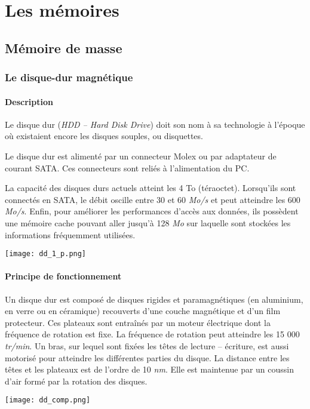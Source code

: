 \section{Les mémoires}
\subsection{Mémoire de masse}
\subsubsection{Le disque-dur magnétique}


\paragraph*{Description}
\begin{minipage}[c]{.65\linewidth}
Le disque dur (\textit{HDD -- Hard Disk Drive}) doit son nom à sa technologie à l'époque où existaient encore les disques souples, ou disquettes.

Le disque dur est alimenté par un connecteur Molex ou par adaptateur de courant SATA. Ces connecteurs sont reliés à l'alimentation du PC. 

La capacité des disques durs actuels atteint les 4 To (téraoctet). Lorsqu'ils sont connectés en SATA, le débit oscille entre 30 et 60 \textit{Mo/s} et peut atteindre les 600 \textit{Mo/s}. Enfin, pour améliorer les performances d'accès aux données, ils possèdent une mémoire cache pouvant aller jusqu'à 128 \textit{Mo} sur laquelle sont stockées les informations fréquemment utilisées. 

\end{minipage}\hfill
\begin{minipage}[c]{.3\linewidth}
\begin{center}
\texttt{[image: dd\_1\_p.png]}
\end{center}
\end{minipage}


\paragraph*{Principe de fonctionnement}


\begin{minipage}[c]{.6\linewidth}
Un disque dur est composé de disques rigides et paramagnétiques (en aluminium, en verre ou en céramique) recouverts d'une couche magnétique et d'un film protecteur. Ces plateaux sont entraînés par un moteur électrique dont la fréquence de rotation est fixe. La fréquence de rotation peut atteindre les 15 000 \textit{tr/min}. Un bras, sur lequel sont fixées les têtes de lecture -- écriture, est aussi motorisé pour atteindre les différentes parties du disque. La distance entre les têtes et les plateaux est de l'ordre de 10 \textit{nm}. Elle est maintenue par un coussin d'air formé par la rotation des disques. 
\end{minipage} \hfill
\begin{minipage}[c]{.35\linewidth}
\begin{center}
\texttt{[image: dd\_comp.png]}
\end{center}
\end{minipage} 

